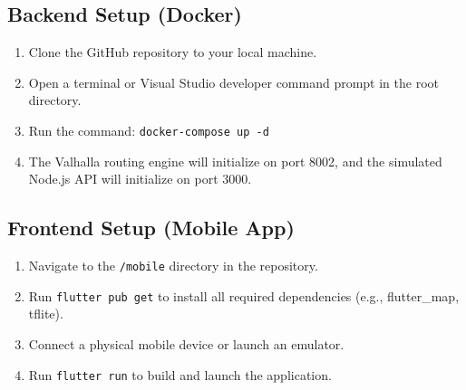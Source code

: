 \documentclass[12pt]{article}
\begin{document}
\subsection{Backend Setup (Docker)}
\begin{enumerate}
    \item Clone the GitHub repository to your local machine.
    \item Open a terminal or Visual Studio developer command prompt in the root directory.
    \item Run the command: \texttt{docker-compose up -d}
    \item The Valhalla routing engine will initialize on port 8002, and the simulated Node.js API will initialize on port 3000.
\end{enumerate}

\subsection{Frontend Setup (Mobile App)}
\begin{enumerate}
    \item Navigate to the \texttt{/mobile} directory in the repository.
    \item Run \texttt{flutter pub get} to install all required dependencies (e.g., flutter\_map, tflite).
    \item Connect a physical mobile device or launch an emulator.
    \item Run \texttt{flutter run} to build and launch the application.
\end{enumerate}
\end{document}
